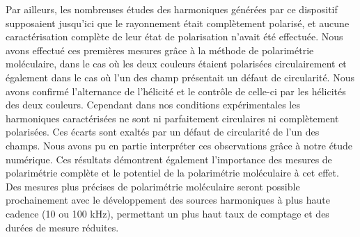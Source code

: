 Par ailleurs, les nombreuses études des harmoniques générées par ce dispositif supposaient jusqu'ici que le rayonnement était complètement polarisé, et aucune caractérisation complète de leur état de polarisation n'avait été effectuée. Nous avons effectué ces premières mesures grâce à la méthode de polarimétrie moléculaire, dans le cas où les deux couleurs étaient polarisées circulairement et également dans le cas où l'un des champ présentait un défaut de circularité. Nous avons confirmé l'alternance de l'hélicité et le contrôle de celle-ci par les hélicités des deux couleurs. Cependant dans nos conditions expérimentales les harmoniques caractérisées ne sont ni parfaitement circulaires ni complètement polarisées. Ces écarts sont exaltés par un défaut de circularité de l'un des champs. Nous avons pu en partie interpréter ces observations grâce à notre étude numérique. Ces résultats démontrent également l'importance des mesures de polarimétrie complète et le potentiel de la polarimétrie moléculaire à cet effet. Des mesures plus précises de polarimétrie moléculaire seront possible prochainement avec le développement des sources harmoniques à plus haute cadence (10 ou 100 kHz), permettant un plus haut taux de comptage et des durées de mesure réduites.


